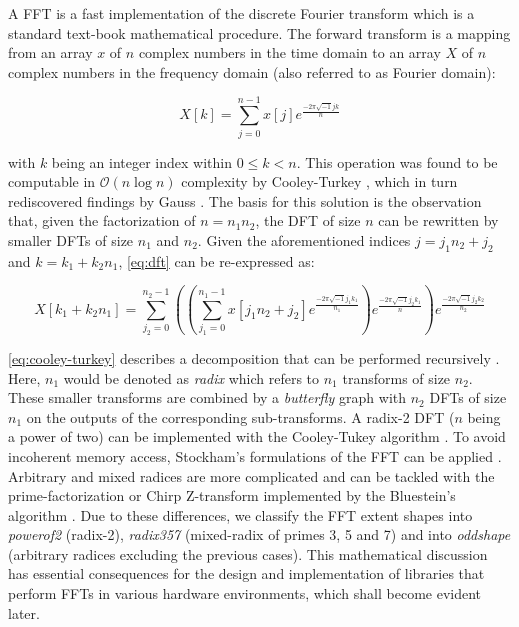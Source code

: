 A FFT is a fast implementation of the discrete Fourier transform which is a standard text-book mathematical procedure. The forward transform is a mapping from an array $x$ of $n$ complex numbers in the time domain to an array $X$ of $n$ complex numbers in the frequency domain (also referred to as Fourier domain):

\begin{equation}
  \label{eq:dft}
  X[k] = \sum_{j=0}^{n-1} x[j]e^{\frac{-2\pi\sqrt{-1}jk}{n}}
\end{equation}

with $k$ being an integer index within $0 \le k < n$. This operation was found to be computable in $\mathcal{O}(n \log n)$ complexity by Cooley-Turkey \cite{cooley1965algorithm}, which in turn rediscovered findings by Gauss \cite{gauss}. The basis for this solution is the observation that, given the factorization of $n=n_1n_2$, the  DFT of size $n$ can be rewritten by smaller DFTs of size $n_1$ and $n_2$.  Given the aforementioned indices $j=j_1n_2 + j_2$ and $k=k_1+k_2n_1$, \cref{eq:dft} can be re-expressed as:

\begin{equation}
  \label{eq:cooley-turkey}
  X[k_1 + k_2n_1] = \sum_{j_2=0}^{n_2-1} \left( \left( \sum_{j_1=0}^{n_1-1} x[j_1n_2 + j_2] e^{\frac{-2\pi\sqrt{-1}j_1k_1}{n_1}} \right) e^{\frac{-2\pi\sqrt{-1}j_2k_1}{n}} \right) e^{\frac{-2\pi\sqrt{-1}j_2k_2}{n_2}}
\end{equation}

\cref{eq:cooley-turkey} describes a decomposition that can be performed recursively \cite{FFTW05}. Here, $n_1$ would be denoted as \emph{radix} which refers to $n_1$ transforms of size $n_2$. These smaller transforms are combined by a \emph{butterfly} graph with $n_2$ DFTs of size $n_1$ on the outputs of the corresponding sub-transforms.
A radix-2 DFT ($n$ being a power of two) can be implemented with the Cooley-Tukey algorithm \cite{cooley1965algorithm}.
To avoid incoherent memory access, Stockham's formulations of the FFT can be applied \cite{FFTW05}.
Arbitrary and mixed radices are more complicated and can be tackled with the prime-factorization or Chirp Z-transform implemented by the Bluestein's algorithm \cite{bluestein}.
Due to these differences, we classify the FFT extent shapes into \emph{powerof2} (radix-2), \emph{radix357} (mixed-radix of primes 3, 5 and 7) and into \emph{oddshape} (arbitrary radices excluding the previous cases).
This mathematical discussion has essential consequences for the design and implementation of libraries that perform FFTs in various hardware environments, which shall become evident later.

